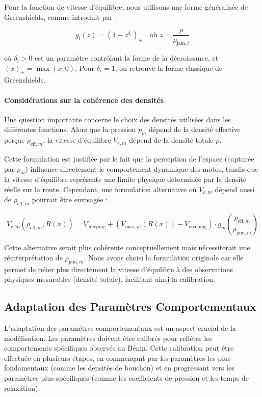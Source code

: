 Pour la fonction de vitesse d'équilibre, nous utilisons une forme généralisée de Greenshields, comme introduit par \cite{Greenshields1935} :

\begin{equation}
g_i(z) = \left(1 - z^{\delta_i}\right)_+ \quad \text{où } z = \frac{\rho}{\rho_{\text{jam},i}}
\end{equation}

où $\delta_i > 0$ est un paramètre contrôlant la forme de la décroissance, et $(x)_+ = \max(x, 0)$. Pour $\delta_i = 1$, on retrouve la forme classique de Greenshields.

\paragraph{Considérations sur la cohérence des densités}
Une question importante concerne le choix des densités utilisées dans les différentes fonctions. Alors que la pression $p_m$ dépend de la densité effective perçue $\rho_{\text{eff},m}$, la vitesse d'équilibre $V_{e,m}$ dépend de la densité totale $\rho$.

Cette formulation est justifiée par le fait que la perception de l'espace (capturée par $p_m$) influence directement le comportement dynamique des motos, tandis que la vitesse d'équilibre représente une limite physique déterminée par la densité réelle sur la route. Cependant, une formulation alternative où $V_{e,m}$ dépend aussi de $\rho_{\text{eff},m}$ pourrait être envisagée :

\begin{equation}
V_{e,m}(\rho_{\text{eff},m}, R(x)) = V_{\text{creeping}} + \left(V_{\text{max},m}(R(x)) - V_{\text{creeping}}\right) \cdot g_m\left(\frac{\rho_{\text{eff},m}}{\rho_{\text{jam},m}}\right)
\end{equation}

Cette alternative serait plus cohérente conceptuellement mais nécessiterait une réinterprétation de $\rho_{\text{jam},m}$. Nous avons choisi la formulation originale car elle permet de relier plus directement la vitesse d'équilibre à des observations physiques mesurables (densité totale), facilitant ainsi la calibration.

\subsection{Adaptation des Paramètres Comportementaux}
L'adaptation des paramètres comportementaux est un aspect crucial de la modélisation. Les paramètres doivent être calibrés pour refléter les comportements spécifiques observés au Bénin. Cette calibration peut être effectuée en plusieurs étapes, en commençant par les paramètres les plus fondamentaux (comme les densités de bouchon) et en progressant vers les paramètres plus spécifiques (comme les coefficients de pression et les temps de relaxation).

